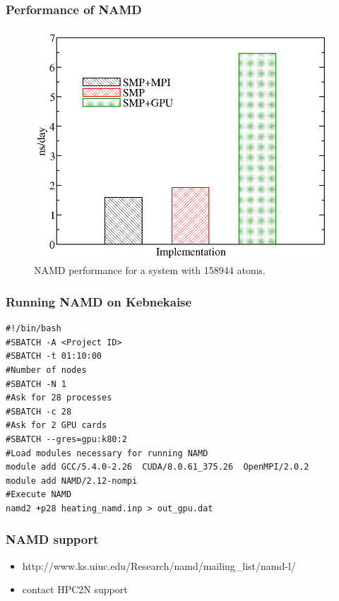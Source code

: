 \documentclass{beamer}
\begin{document}
\begin{frame}
  \frametitle{Performance of NAMD}


\begin{figure}
\includegraphics[scale=0.26]{profiling_namd2.png}
\caption{{\scriptsize  NAMD performance for a system with 158944 atoms.}}
\end{figure}


\end{frame}

\begin{frame}[fragile]
\frametitle{Running NAMD on Kebnekaise}

\begin{verbatim} 
#!/bin/bash
#SBATCH -A <Project ID>
#SBATCH -t 01:10:00
#Number of nodes
#SBATCH -N 1
#Ask for 28 processes
#SBATCH -c 28
#Ask for 2 GPU cards
#SBATCH --gres=gpu:k80:2
#Load modules necessary for running NAMD
module add GCC/5.4.0-2.26  CUDA/8.0.61_375.26  OpenMPI/2.0.2
module add NAMD/2.12-nompi
#Execute NAMD
namd2 +p28 heating_namd.inp > out_gpu.dat
\end{verbatim} 

\end{frame}
\begin{frame}
\frametitle{NAMD support}
\begin{itemize}
	\item http://www.ks.uiuc.edu/Research/namd/mailing\_list/namd-l/
	\item contact HPC2N support
\end{itemize}
\end{frame}
\end{document}
